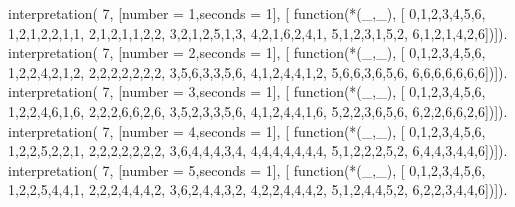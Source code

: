 interpretation( 7, [number = 1,seconds = 1], [
    function(*(_,_), [
        0,1,2,3,4,5,6,
        1,2,1,2,2,1,1,
        2,1,2,1,1,2,2,
        3,2,1,2,5,1,3,
        4,2,1,6,2,4,1,
        5,1,2,3,1,5,2,
        6,1,2,1,4,2,6])]).
interpretation( 7, [number = 2,seconds = 1], [
    function(*(_,_), [
        0,1,2,3,4,5,6,
        1,2,2,4,2,1,2,
        2,2,2,2,2,2,2,
        3,5,6,3,3,5,6,
        4,1,2,4,4,1,2,
        5,6,6,3,6,5,6,
        6,6,6,6,6,6,6])]).
interpretation( 7, [number = 3,seconds = 1], [
    function(*(_,_), [
        0,1,2,3,4,5,6,
        1,2,2,4,6,1,6,
        2,2,2,6,6,2,6,
        3,5,2,3,3,5,6,
        4,1,2,4,4,1,6,
        5,2,2,3,6,5,6,
        6,2,2,6,6,2,6])]).
interpretation( 7, [number = 4,seconds = 1], [
    function(*(_,_), [
        0,1,2,3,4,5,6,
        1,2,2,5,2,2,1,
        2,2,2,2,2,2,2,
        3,6,4,4,4,3,4,
        4,4,4,4,4,4,4,
        5,1,2,2,2,5,2,
        6,4,4,3,4,4,6])]).
interpretation( 7, [number = 5,seconds = 1], [
    function(*(_,_), [
        0,1,2,3,4,5,6,
        1,2,2,5,4,4,1,
        2,2,2,4,4,4,2,
        3,6,2,4,4,3,2,
        4,2,2,4,4,4,2,
        5,1,2,4,4,5,2,
        6,2,2,3,4,4,6])]).
